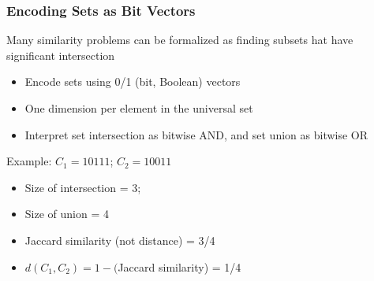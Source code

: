 \documentclass[svgnames]{beamer}
\begin{document}
\begin{frame} \frametitle{Encoding Sets as Bit Vectors}

\begin{block}{}
Many similarity problems can be formalized as finding subsets hat have significant intersection

\begin{itemize}
\item Encode sets using 0/1 (bit, Boolean) vectors
\item One dimension per element in the universal set
\item Interpret set intersection as bitwise AND, and set union as bitwise OR
\end{itemize}
\end{block}

\begin{block}{Example: $C_1 = 10111$; $C_2 = 10011$}
  \begin{itemize}
  \item Size of intersection = 3; 
  \item Size of union = 4
  \item Jaccard similarity (not distance) = 3/4
  \item $d(C_1,C_2) = 1 - ($Jaccard similarity) = 1/4
  \end{itemize}
\end{block}  
\end{frame}

  
\end{document}

